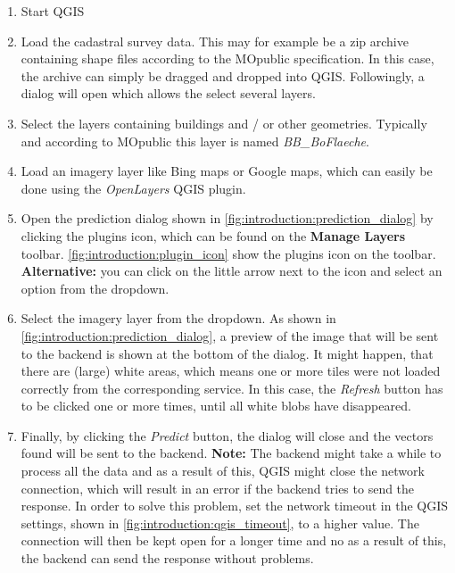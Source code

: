 \begin{enumerate}
    \item Start QGIS
    \item Load the cadastral survey data. This may for example be a zip archive containing shape files according to the MOpublic \cite{mopublic}  specification. In this case, the archive can simply be dragged and dropped into QGIS. Followingly, a dialog will open which allows the select several layers. 
    \item Select the layers containing buildings and / or other geometries. Typically and according to MOpublic this layer is named \textit{BB\_BoFlaeche}.
    \item Load an imagery layer like Bing maps or Google maps, which can easily be done using the \textit{OpenLayers} QGIS plugin.
    \item Open the prediction dialog shown in \autoref{fig:introduction:prediction_dialog} by clicking the plugins icon, which can be found on the \textbf{Manage Layers} toolbar. \autoref{fig:introduction:plugin_icon} show the plugins icon on the toolbar. \textbf{Alternative:} you can click on the little arrow next to the icon and select an option from the dropdown.
    \item Select the imagery layer from the dropdown. As shown in \autoref{fig:introduction:prediction_dialog}, a preview of the image that will be sent to the backend is shown at the bottom of the dialog. It might happen, that there are (large) white areas, which means one or more tiles were not loaded correctly from the corresponding service. In this case, the \textit{Refresh} button has to be clicked one or more times, until all white blobs have disappeared.
    \item Finally, by clicking the \textit{Predict} button, the dialog will close and the vectors found will be sent to the backend. \textbf{Note:} The backend might take a while to process all the data and as a result of this, QGIS might close the network connection, which will result in an error if the backend tries to send the response. In order to solve this problem, set the network timeout in the QGIS settings, shown in \autoref{fig:introduction:qgis_timeout}, to a higher value. The connection will then be kept open for a longer time and no as a result of this, the backend can send the response without problems.
\end{enumerate}


